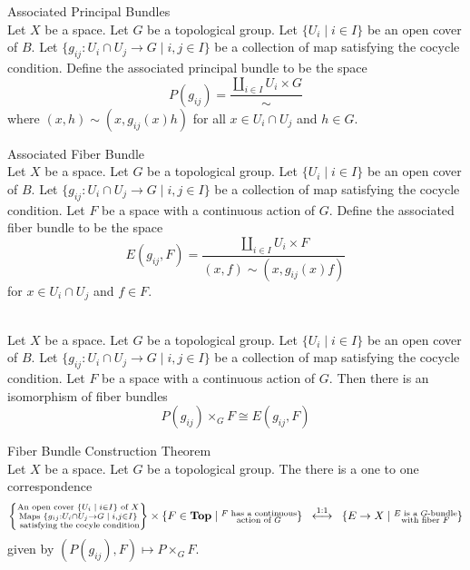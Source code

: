 \documentclass[a4paper]{article}
\begin{document}
\begin{defn}{Associated Principal Bundles}{}\\
Let $X$ be a space. Let $G$ be a topological group. Let $\{U_i\;|\;i\in I\}$ be an open cover of $B$. Let $\{g_{ij}:U_i\cap U_j\to G\;|\;i,j\in I\}$ be a collection of map satisfying the cocycle condition. Define the associated principal bundle to be the space $$P(g_{ij})=\frac{\coprod_{i\in I}U_i\times G}{\sim}$$ where $(x,h)\sim(x,g_{ij}(x)h)$ for all $x\in U_i\cap U_j$ and $h\in G$. 
\end{defn}

\begin{defn}{Associated Fiber Bundle}{}\\
Let $X$ be a space. Let $G$ be a topological group. Let $\{U_i\;|\;i\in I\}$ be an open cover of $B$. Let $\{g_{ij}:U_i\cap U_j\to G\;|\;i,j\in I\}$ be a collection of map satisfying the cocycle condition. Let $F$ be a space with a continuous action of $G$. Define the associated fiber bundle to be the space $$E(g_{ij},F)=\frac{\coprod_{i\in I}U_i\times F}{(x,f)\sim(x,g_{ij}(x)f)}$$ for $x\in U_i\cap U_j$ and $f\in F$. 
\end{defn}

\begin{prp}{}{}\\
Let $X$ be a space. Let $G$ be a topological group. Let $\{U_i\;|\;i\in I\}$ be an open cover of $B$. Let $\{g_{ij}:U_i\cap U_j\to G\;|\;i,j\in I\}$ be a collection of map satisfying the cocycle condition. Let $F$ be a space with a continuous action of $G$. Then there is an isomorphism of fiber bundles $$P(g_{ij})\times_GF\cong E(g_{ij},F)$$
\end{prp}

\begin{thm}{Fiber Bundle Construction Theorem}{}\\
Let $X$ be a space. Let $G$ be a topological group. The there is a one to one correspondence $$\left\{\substack{\text{An open cover }\{U_i\;|\;i\in I\}\text{ of }X\\\text{Maps }\{g_{ij}:U_i\cap U_j\to G\;|\;i,j\in I\}\\\text{ satisfying the cocyle condition}}\right\}\times\{F\in\bold{Top}\;|\;\substack{F\text{ has a continuous}\\\text{action of }G}\}\;\;\overset{1:1}{\longleftrightarrow}\;\;\left\{E\to X\;|\;\substack{E\text{ is a }G\text{-bundle}\\\text{with fiber }F}\right\}$$ given by $(P(g_{ij}),F)\mapsto P\times_GF$. 
\end{thm}
\end{document}
